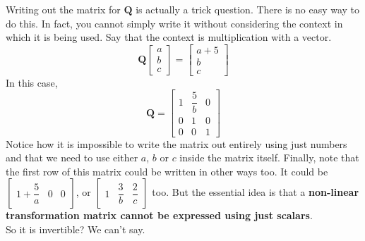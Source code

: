 \begin{enumerate}
{	Writing out the matrix for $\mathbf{Q}$ is actually a trick question. There is no easy way to do this. In fact, you cannot simply write it without considering the context in which it is being used. Say that the context is multiplication with a vector. \\
	$$\mathbf{Q}\begin{bmatrix} a \\ b \\ c\end{bmatrix} = \begin{bmatrix} a + 5 \\ b \\ c \end{bmatrix}$$ In this case, $$\mathbf{Q} = \begin{bmatrix} 1 & \dfrac{5}{b} & 0 \\ 0 & 1 & 0 \\ 0 & 0 & 1 \end{bmatrix}$$ 
	Notice how it is impossible to write the matrix out entirely using just numbers and that we need to use either $a$, $b$ or $c$ inside the matrix itself. 
	Finally, note that the first row of this matrix could be written in other ways too. It could be $\begin{bmatrix} 1 + \dfrac{5}{a} & 0 & 0\end{bmatrix}$, or $\begin{bmatrix} 1 & \dfrac{3}{b} & \dfrac{2}{c}\end{bmatrix}$ too. But the essential idea is that a \textbf{non-linear transformation matrix cannot be expressed using just scalars}. \\
	So it is invertible? We can't say. 
}



\end{enumerate}